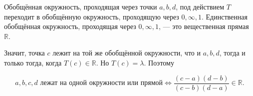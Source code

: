 \documentclass[12pt,a4paper]{article}
\begin{document}
Обобщённая окружность, проходящая через точки $a,b,d$, под действием $T$ переходит в обобщённую окружность, проходящую через $0,\infty,1$. Единственная обобщённая окружность, проходящая через $0,\infty,1$, — это вещественная прямая $\mathbb R$.

Значит, точка $c$ лежит на той же обобщённой окружности, что и $a,b,d$, тогда и только тогда, когда $T(c)\in\mathbb R$. Но $T(c)=\lambda$. Поэтому

\[
\boxed{
a,b,c,d \text{ лежат на одной окружности или прямой}
\iff
\frac{(c-a)(d-b)}{(c-b)(d-a)}\in\mathbb R.
}
\]
\end{document}
